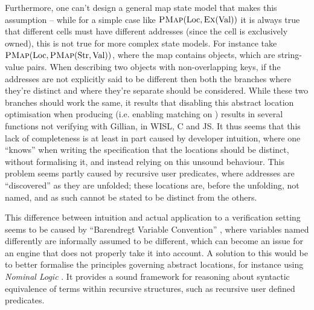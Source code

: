 Furthermore, one can't design a general map state model that makes this assumption -- while for a simple case like $\textsc{PMap}(\text{Loc}, \textsc{Ex}(\text{Val}))$ it is always true that different cells must have different addresses (since the cell is exclusively owned), this is not true for more complex state models. For instance take $\textsc{PMap}(\text{Loc}, \textsc{PMap}(\text{Str}, \text{Val}))$, where the map contains objects, which are string-value pairs. When describing two objects with non-overlapping keys, if the addresses are not explicitly said to be different then both the branches where they're distinct and where they're separate should be considered. While these two branches should work the same, it results that disabling this abstract location optimisation when producing (i.e. enabling matching on \produce) results in several functions not verifying with Gillian, in WISL, C and JS. It thus seems that this lack of completeness is at least in part caused by developer intuition, where one ``knows'' when writing the specification that the locations should be distinct, without formalising it, and instead relying on this unsound behaviour. This problem seems partly caused by recursive user predicates, where addresses are ``discovered'' as they are unfolded; these locations are, before the unfolding, not named, and as such cannot be stated to be distinct from the others.

This difference between intuition and actual application to a verification setting seems to be caused by ``Barendregt Variable Convention'' \cite{formalbarendregt}, where variables named differently are informally assumed to be different, which can become an issue for an engine that does not properly take it into account. A solution to this would be to better formalise the principles governing abstract locations, for instance using \emph{Nominal Logic} \cite{nominallogic,formalbarendregt}. It provides a sound framework for reasoning about syntactic equivalence of terms within recursive structures, such as recursive user defined predicates.
